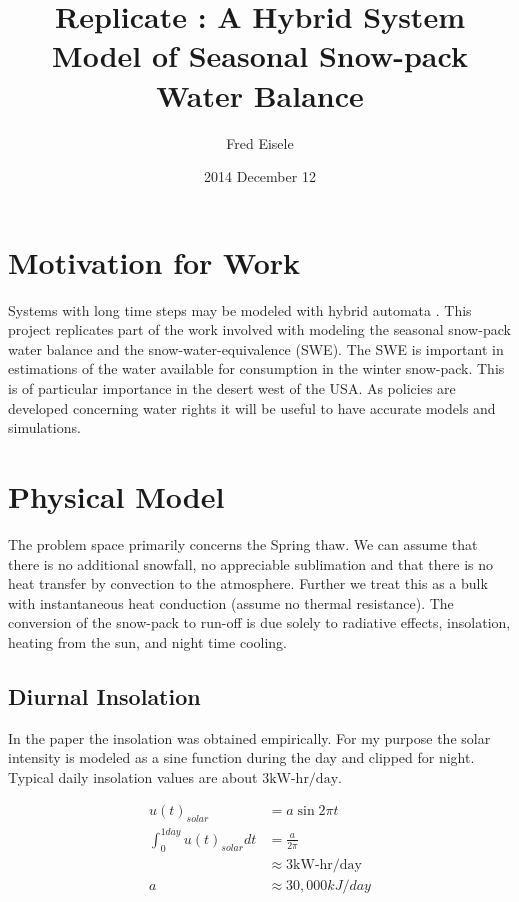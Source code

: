 \documentclass{article}
\title{Replicate : A Hybrid System Model of Seasonal Snow-pack Water Balance}
\author{Fred Eisele }
\date{2014 December 12}
\begin{document}
\maketitle

\section{Motivation for Work}

Systems with long time steps may be modeled with hybrid automata
\cite{kerkez2010swb}.
This project replicates part of the work involved with modeling
the seasonal snow-pack water balance and the snow-water-equivalence (SWE).
The SWE is important in estimations of the water available
for consumption in the winter snow-pack.
This is of particular importance in the desert west of the USA.
As policies are developed concerning water rights it 
will be useful to have accurate models and simulations.

\section{Physical Model}

The problem space primarily concerns the Spring thaw.
We can assume that there is no additional snowfall, 
no appreciable sublimation and that there is no 
heat transfer by convection to the atmosphere.
Further we treat this as a bulk with instantaneous 
heat conduction (assume no thermal resistance).
The conversion of the snow-pack to run-off is due solely
to radiative effects, insolation, heating from the sun, 
and night time cooling.

\subsection{Diurnal Insolation}


In the paper the insolation was obtained empirically.
For my purpose the solar intensity is modeled as a sine 
function during the day and clipped for night.
Typical daily insolation values are about $3 \text{kW-hr/day}$.

\begin{align}
u(t)_{solar} &= a \sin{2 \pi t} \\
\int_0^{1 day} u(t)_{solar} dt &= \frac{a}{2 \pi} \\
  &\approx 3 \text{kW-hr/day} \\
a &\approx 30,000 kJ/day
\end{align}
\end{document}

